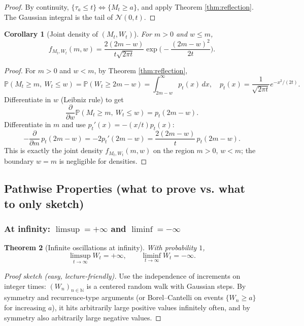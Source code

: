 \documentclass[11pt]{article}
\newtheorem{theorem}{Theorem}[section]
\newtheorem{corollary}[theorem]{Corollary}
\theoremstyle{definition}
\theoremstyle{remark}
\newcommand{\Pbb}{\mathbb{P}}
\newcommand{\N}{\mathbb{N}}
\begin{document}
\begin{proof}
By continuity, $\{\tau_a\le t\}\iff\{M_t\ge a\}$, and apply Theorem \ref{thm:reflection}.
The Gaussian integral is the tail of $\mathcal N(0,t)$.
\end{proof}

\begin{corollary}[Joint density of $(M_t,W_t)$]\label{cor:jointdensity}
For $m>0$ and $w\le m$,
\[
f_{M_t,W_t}(m,w)
=
\frac{2(2m-w)}{t\sqrt{2\pi t}}
\exp\!\Big(-\frac{(2m-w)^2}{2t}\Big).
\]
\end{corollary}

\begin{proof}
For $m>0$ and $w<m$, by Theorem \ref{thm:reflection},
\[
\Pbb(M_t\ge m,\ W_t\le w)=\Pbb(W_t\ge 2m-w)=\int_{2m-w}^\infty p_t(x)\,dx,
\quad p_t(x)=\frac1{\sqrt{2\pi t}}e^{-x^2/(2t)}.
\]
Differentiate in $w$ (Leibniz rule) to get
\[
\frac{\partial}{\partial w}\Pbb(M_t\ge m,\ W_t\le w)=p_t(2m-w).
\]
Differentiate in $m$ and use $p_t'(x)=-(x/t)p_t(x)$:
\[
-\frac{\partial}{\partial m}\,p_t(2m-w)
=
-2p_t'(2m-w)
=
\frac{2(2m-w)}{t}\,p_t(2m-w).
\]
This is exactly the joint density $f_{M_t,W_t}(m,w)$ on the region $m>0$, $w<m$;
the boundary $w=m$ is negligible for densities.
\end{proof}



\subsection{Pathwise Properties (what to prove vs. what to only sketch)}

\subsubsection{At infinity: $\limsup=+\infty$ and $\liminf=-\infty$}

\begin{theorem}[Infinite oscillations at infinity]
With probability $1$,
\[
\limsup_{t\to\infty} W_t = +\infty,
\qquad
\liminf_{t\to\infty} W_t = -\infty.
\]
\end{theorem}

\begin{proof}[Proof sketch (easy, lecture-friendly)]
Use the independence of increments on integer times:
$(W_n)_{n\in\N}$ is a centered random walk with Gaussian steps.
By symmetry and recurrence-type arguments (or Borel--Cantelli on events $\{W_n\ge a\}$ for increasing $a$),
it hits arbitrarily large positive values infinitely often, and by symmetry also arbitrarily large negative values.
\end{proof}
\end{document}
